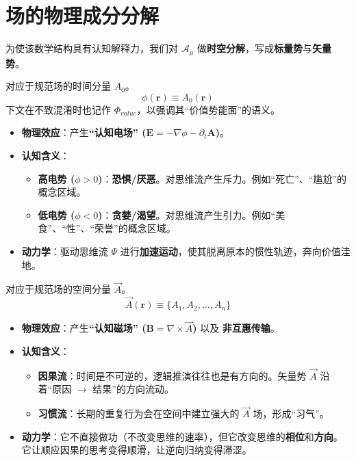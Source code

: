 \section{场的物理成分分解}
\label{sec:section_6772}

为使该数学结构具有认知解释力，我们对 $\mathcal{A}_\mu$ 做\textbf{时空分解}，写成\textbf{标量势}与\textbf{矢量势}。


对应于规范场的时间分量 $A_0$。
$$ \phi(\mathbf{r}) \equiv A_0(\mathbf{r}) $$
下文在不致混淆时也记作 $\Phi_{value}$，以强调其“价值势能面”的语义。

\begin{itemize}
    \item \textbf{物理效应}：产生\textbf{“认知电场” ($\mathbf{E} = -\nabla \phi - \partial_t \mathbf{A}$)}。
    \item \textbf{认知含义}：
    \begin{itemize}
        \item \textbf{高电势 ($\phi > 0$)}：\textbf{恐惧/厌恶}。对思维流产生斥力。例如“死亡”、“尴尬”的概念区域。
        \item \textbf{低电势 ($\phi < 0$)}：\textbf{贪婪/渴望}。对思维流产生引力。例如“美食”、“性”、“荣誉”的概念区域。
    \end{itemize}
    \item \textbf{动力学}：驱动思维流 $\Psi$ 进行\textbf{加速运动}，使其脱离原本的惯性轨迹，奔向价值洼地。
\end{itemize}


对应于规范场的空间分量 $\vec{A}$。
$$ \vec{A}(\mathbf{r}) \equiv \{ A_1, A_2, \dots, A_n \} $$

\begin{itemize}
    \item \textbf{物理效应}：产生\textbf{“认知磁场” ($\mathbf{B} = \nabla \times \vec{A}$)} 以及 \textbf{非互惠传输}。
    \item \textbf{认知含义}：
    \begin{itemize}
        \item \textbf{因果流}：时间是不可逆的，逻辑推演往往也是有方向的。矢量势 $\vec{A}$ 沿着“原因 $\to$ 结果”的方向流动。
        \item   \textbf{习惯流}：长期的重复行为会在空间中建立强大的 $\vec{A}$ 场，形成“习气”。
    \end{itemize}
    \item \textbf{动力学}：它不直接做功（不改变思维的速率），但它改变思维的\textbf{相位}和\textbf{方向}。它让顺应因果的思考变得顺滑，让逆向归纳变得滞涩。
\end{itemize}



